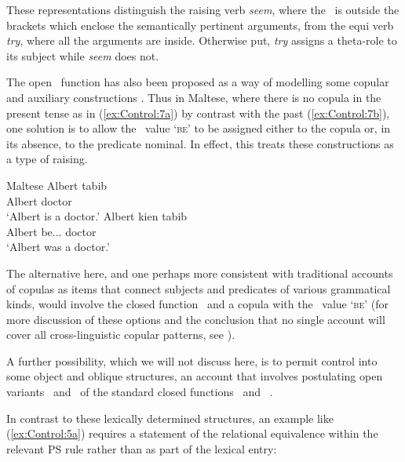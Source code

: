 \documentclass[output=paper,hidelinks]{langscibook}
\begin{document}
\ea\label{ex:Control:6}
\ea\label{ex:Control:6a} 
 
\ex\label{ex:Control:6b}
\z\z

These representations distinguish the raising verb \emph{seem}, where the \SUBJ\ is outside the brackets which enclose the semantically pertinent arguments, from the equi verb \emph{try}, where all the arguments are inside. Otherwise put, \emph{try} assigns a theta-role to its subject while \emph{seem} does not.

The open \XCOMP\ function has also been proposed as a way of modelling some copular and auxiliary constructions \citep{Falk84}. Thus in Maltese, where there is no copula in the present tense as in (\ref{ex:Control:7a}) by contrast with the past (\ref{ex:Control:7b}), one solution is to allow the \PRED\ value `\textsc{be}\arglist{\XCOMP}\SUBJ' to be assigned either to the copula or, in its absence, to the predicate nominal. In effect, this treats these constructions as a type of raising.

\ea\label{ex:Control:7} Maltese
\ea\label{ex:Control:7a}\gll Albert tabib\\
Albert   doctor\\
\glt `Albert is a doctor.'
\ex\label{ex:Control:7b}\gll Albert kien    tabib\\
    Albert   {be.\PST.\M.\SG} doctor\\
    \glt`Albert was a doctor.'
\z\z
                
The alternative here, and one perhaps more consistent with traditional accounts of copulas as items that connect subjects and predicates of various grammatical kinds, would involve the closed function \PREDLINK\ and a copula with the \PRED\ value `\textsc{be}\arglist{\SUBJ,\PREDLINK}' (for more discussion of these options and the conclusion that no single account will cover all cross-linguistic copular patterns, see \citet[189--197]{DLM:LFG}).

A further possibility, which we will not discuss here, is to permit control into some object and oblique structures, an account that involves postulating open variants \XOBJ\ and \XOBL\ of the standard closed functions \OBJ\ and \OBL\ \citep{Falk:05}.

 In contrast to these lexically determined structures, an example like (\ref{ex:Control:5a}) requires a statement of the relational equivalence within the relevant PS rule rather than as part of the lexical entry:
\end{document}
